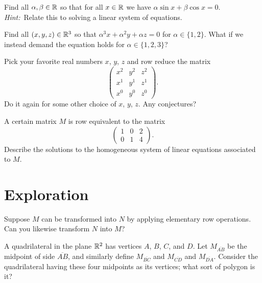 \documentclass{homework}
\begin{document}
\begin{problem}\label{sin-cos-linear-system}Find all $\alpha, \beta \in \mathbb{R}$ so that for all $x \in \mathbb{R}$ we have $\alpha \sin x + \beta \cos x = 0$.  \textit{Hint:}~Relate this to solving a linear system of equations.
\end{problem}

\begin{problem}
  Find all $(x,y,z) \in \mathbb{R}^3$ so that $\alpha^3 x + \alpha^2 y + \alpha z = 0$ for $\alpha \in \{1,2\}$.  What if we instead demand the equation holds for $\alpha \in \{1,2,3\}$?
\end{problem}

\begin{problem}\label{vandermonde-introduction}Pick your favorite real numbers $x$, $y$, $z$ and row reduce the matrix
  \[
    \begin{pmatrix}
      x^2 & y^2 & z^2 \\
      x^1 & y^1 & z^1 \\
      x^0 & y^0 & z^0            
    \end{pmatrix}.
  \]
  Do it again for some other choice of $x$, $y$, $z$.  Any conjectures?
\end{problem}

\begin{problem}
  A certain matrix $M$ is row equivalent to the matrix
  \[
    \begin{pmatrix}
      1 & 0 & 2 \\
      0 & 1 & 4
    \end{pmatrix}.
  \]
  Describe the solutions to the homogeneous system of linear equations
  associated to $M$.
\end{problem}

\section{Exploration}

\begin{problem}
  Suppose $M$ can be transformed into $N$ by applying elementary row
  operations.  Can you likewise transform $N$ into $M$?
\end{problem}

\begin{problem}\label{exploration:quadrilateral-midpoints}
  A quadrilateral in the plane $\mathbb{R}^2$ has vertices $A$, $B$, $C$, and
  $D$.  Let $M_{\overline{AB}}$ be the midpoint of side
  $\overline{AB}$, and similarly define $M_{\overline{BC}}$ and
  $M_{\overline{CD}}$ and $M_{\overline{DA}}$.  Consider the
  quadrilateral having these four midpoints as its vertices; what sort
  of polygon is it?
\end{problem}
\end{document}
